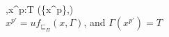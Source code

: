 \\[0.2cm]
	\inference[]{}
	{\Gamma,\Pi \vdash x^p:T \sqcup (\{x^p\},\emptyset)}\\[0.3cm]
	$x^{p'}=uf_{ \sqsubseteq_\Pi}(x,\Gamma)$, and $\Gamma(x^{p'})=T$

